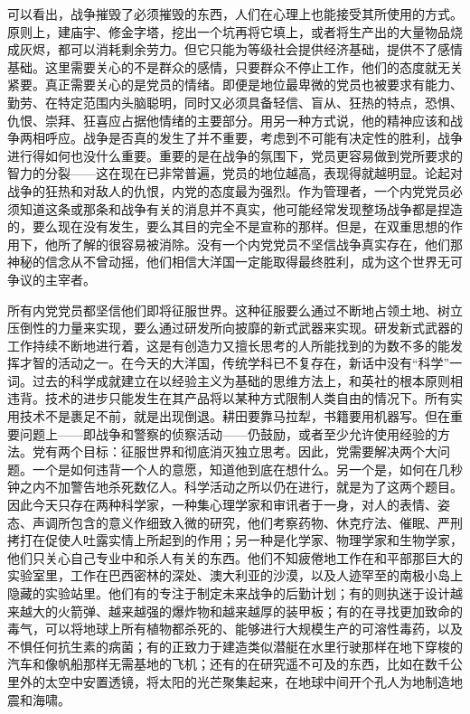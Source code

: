 可以看出，战争摧毁了必须摧毁的东西，人们在心理上也能接受其所使用的方式。原则上，建庙宇、修金字塔，挖出一个坑再将它填上，或者将生产出的大量物品烧成灰烬，都可以消耗剩余劳力。但它只能为等级社会提供经济基础，提供不了感情基础。这里需要关心的不是群众的感情，只要群众不停止工作，他们的态度就无关紧要。真正需要关心的是党员的情绪。即便是地位最卑微的党员也被要求有能力、勤劳、在特定范围内头脑聪明，同时又必须具备轻信、盲从、狂热的特点，恐惧、仇恨、崇拜、狂喜应占据他情绪的主要部分。用另一种方式说，他的精神应该和战争两相呼应。战争是否真的发生了并不重要，考虑到不可能有决定性的胜利，战争进行得如何也没什么重要。重要的是在战争的氛围下，党员更容易做到党所要求的智力的分裂——这在现在已非常普遍，党员的地位越高，表现得就越明显。论起对战争的狂热和对敌人的仇恨，内党的态度最为强烈。作为管理者，一个内党党员必须知道这条或那条和战争有关的消息并不真实，他可能经常发现整场战争都是捏造的，要么现在没有发生，要么其目的完全不是宣称的那样。但是，在双重思想的作用下，他所了解的很容易被消除。没有一个内党党员不坚信战争真实存在，他们那神秘的信念从不曾动摇，他们相信大洋国一定能取得最终胜利，成为这个世界无可争议的主宰者。

所有内党党员都坚信他们即将征服世界。这种征服要么通过不断地占领土地、树立压倒性的力量来实现，要么通过研发所向披靡的新式武器来实现。研发新式武器的工作持续不断地进行着，这是有创造力又擅长思考的人所能找到的为数不多的能发挥才智的活动之一。在今天的大洋国，传统学科已不复存在，新话中没有``科学''一词。过去的科学成就建立在以经验主义为基础的思维方法上，和英社的根本原则相违背。技术的进步只能发生在其产品将以某种方式限制人类自由的情况下。所有实用技术不是裹足不前，就是出现倒退。耕田要靠马拉犁，书籍要用机器写。但在重要问题上——即战争和警察的侦察活动——仍鼓励，或者至少允许使用经验的方法。党有两个目标：征服世界和彻底消灭独立思考。因此，党需要解决两个大问题。一个是如何违背一个人的意愿，知道他到底在想什么。另一个是，如何在几秒钟之内不加警告地杀死数亿人。科学活动之所以仍在进行，就是为了这两个题目。因此今天只存在两种科学家，一种集心理学家和审讯者于一身，对人的表情、姿态、声调所包含的意义作细致入微的研究，他们考察药物、休克疗法、催眠、严刑拷打在促使人吐露实情上所起到的作用；另一种是化学家、物理学家和生物学家，他们只关心自己专业中和杀人有关的东西。他们不知疲倦地工作在和平部那巨大的实验室里，工作在巴西密林的深处、澳大利亚的沙漠，以及人迹罕至的南极小岛上隐藏的实验站里。他们有的专注于制定未来战争的后勤计划；有的则执迷于设计越来越大的火箭弹、越来越强的爆炸物和越来越厚的装甲板；有的在寻找更加致命的毒气，可以将地球上所有植物都杀死的、能够进行大规模生产的可溶性毒药，以及不惧任何抗生素的病菌；有的正致力于建造类似潜艇在水里行驶那样在地下穿梭的汽车和像帆船那样无需基地的飞机；还有的在研究遥不可及的东西，比如在数千公里外的太空中安置透镜，将太阳的光芒聚集起来，在地球中间开个孔人为地制造地震和海啸。

